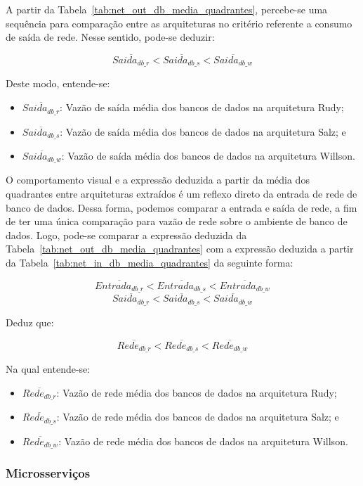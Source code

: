 A partir da Tabela~\ref{tab:net_out_db_media_quadrantes}, percebe-se uma sequência para comparação entre as arquiteturas no critério referente a consumo de saída de rede.
%
Nesse sentido, pode-se deduzir:

$$
    \overline{Saida_{db\_r}} < \overline{Saida_{db\_s}} < \overline{Saida_{db\_w}}
$$

Deste modo, entende-se:

\begin{itemize}
 \item $\overline{Saida_{db\_r}}$: Vazão de saída média dos bancos de dados na arquitetura Rudy;
 \item $\overline{Saida_{db\_s}}$: Vazão de saída média dos bancos de dados na arquitetura Salz; e
 \item $\overline{Saida_{db\_w}}$: Vazão de saída média dos bancos de dados na arquitetura Willson.
\end{itemize}

O comportamento visual e a expressão deduzida a partir da média dos quadrantes entre arquiteturas extraídos é um reflexo direto da entrada de rede de banco de dados.
%
Dessa forma, podemos comparar a entrada e saída de rede, a fim de ter uma única comparação para vazão de rede sobre o ambiente de banco de dados.
%
Logo, pode-se comparar a expressão deduzida da Tabela~\ref{tab:net_out_db_media_quadrantes} com a expressão deduzida a partir da Tabela~\ref{tab:net_in_db_media_quadrantes} da seguinte forma:

$$
    \overline{Entrada_{db\_r}} < \overline{Entrada_{db\_s}} < \overline{Entrada_{db\_w}}
$$
$$
    \overline{Saida_{db\_r}} < \overline{Saida_{db\_s}} < \overline{Saida_{db\_w}}
$$

Deduz que:

$$
    \overline{Rede_{db\_r}} < \overline{Rede_{db\_s}} < \overline{Rede_{db\_w}}
$$

Na qual entende-se:

\begin{itemize}
 \item $\overline{Rede_{db\_r}}$: Vazão de rede média dos bancos de dados na arquitetura Rudy;
 \item $\overline{Rede_{db\_s}}$: Vazão de rede média dos bancos de dados na arquitetura Salz; e
 \item $\overline{Rede_{db\_w}}$: Vazão de rede média dos bancos de dados na arquitetura Willson.
\end{itemize}

\subsubsection{Microsserviços}

